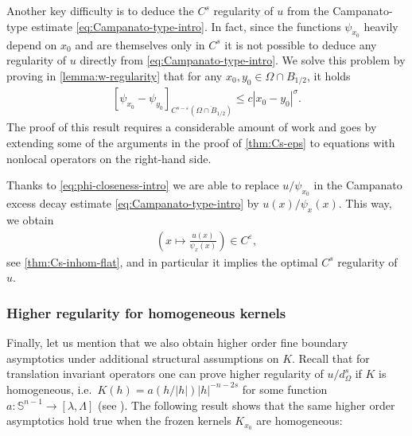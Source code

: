 \documentclass[11pt,reqno]{amsart}
\theoremstyle{plain}
\theoremstyle{definition}
\numberwithin{equation}{section}
\newcommand{\eps}{\varepsilon}
\newcommand{\1}{\mathbbm{1}}
\begin{document}
Another key difficulty is to deduce the $C^s$ regularity of $u$ from the Campanato-type estimate \eqref{eq:Campanato-type-intro}. In fact, since the functions $\psi_{x_0}$ heavily depend on $x_0$ and are themselves only in $C^s$ it is not possible to deduce any regularity of $u$ directly from \eqref{eq:Campanato-type-intro}. We solve this problem by proving in \autoref{lemma:w-regularity} that for any $x_0,y_0 \in \Omega \cap B_{1/2}$, it holds
\begin{align}
\label{eq:phi-closeness-intro}
[\psi_{x_0} - \psi_{y_0}]_{C^{s-\eps}(\overline{\Omega \cap B_{1/2}})} \le c |x_0 - y_0|^{\sigma}.
\end{align}
The proof of this result requires a considerable amount of work and goes by  extending some of the arguments in the proof of \autoref{thm:Cs-eps} to equations with nonlocal operators on the right-hand side. 

Thanks to \eqref{eq:phi-closeness-intro} we are able to replace $u/\psi_{x_0}$ in the Campanato excess decay estimate \eqref{eq:Campanato-type-intro} by $u(x)/\psi_{x}(x)$. This way, we obtain
\begin{align*}
   \left( x \mapsto \frac{u(x)}{\psi_{x}(x)} \right) \in C^{\eps},
\end{align*}
see \autoref{thm:Cs-inhom-flat}, and in particular it implies the optimal $C^s$ regularity of $u$.



\subsubsection{Higher regularity for homogeneous kernels}

Finally, let us mention that we also obtain higher order fine boundary asymptotics under additional structural assumptions on $K$. Recall that for translation invariant operators one can prove higher regularity of $u/d_{\Omega}^s$ if $K$ is homogeneous, i.e.\ $K(h) = a(h/|h|)|h|^{-n-2s}$ for some function $a : \mathbb{S}^{n-1} \to [\lambda,\Lambda]$ (see \cite{RoSe16,RoSe16b,RoSe17,AbRo20}). The following result shows that the same higher order asymptotics hold true when the frozen kernels $K_{x_0}$ are homogeneous:
\end{document}

